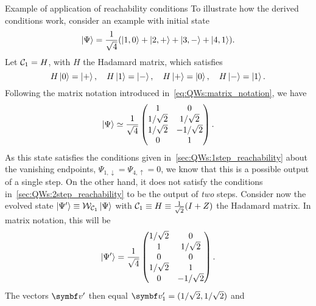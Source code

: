 \begin{examplebox}[label=ex:QWs:conditions_few_steps]{Example of application of reachability conditions}
\fontsize{10pt}{10pt}\selectfont
    To illustrate how the derived conditions work, consider an example with initial state
    \begin{equation}
        \ket{\Psi} = \frac{1}{\sqrt4} (
        \ket{1,0} + \ket{2,+} + \ket{3, -} + \ket{4, 1}
        ).
    \end{equation}
    Let ${\mathcal{C}}_1=H$, with $H$ the Hadamard matrix, which satisfies
    \begin{equation}
        H\ket0=\ket+, \quad H\ket1=\ket-,
        \quad H\ket+=\ket0, \quad H\ket-=\ket1.
    \end{equation}
    Following the matrix notation introduced in~\cref{eq:QWs:matrix_notation}, we have
    \begin{equation}
        \ket{\Psi} \simeq
        \frac{1}{\sqrt4}
        \begin{pmatrix}
            1 & 0 \\
            1/\sqrt2 & 1/\sqrt2 \\
            1/\sqrt2 & -1/\sqrt2 \\
            0 & 1
        \end{pmatrix}.
    \end{equation}
    As this state satisfies the conditions given in~\cref{sec:QWs:1step_reachability} about the vanishing endpoints, $\Psi_{1,\downarrow}=\Psi_{4,\uparrow}=0$, we know that this is a possible output of a single step. On the other hand, it does not satisfy the conditions in~\cref{sec:QWs:2step_reachability} to be the output of \textit{two} steps.
    Consider now the evolved state $\ket{\Psi'}\equiv{\mathcal{W}}_{{\mathcal{C}}_1}\ket\Psi$ with ${\mathcal{C}}_1\equiv H\equiv\frac{1}{\sqrt2}(I+Z)$ the Hadamard matrix. In matrix notation, this will be
    \begin{equation}
        \ket{\Psi'} =
        \frac{1}{\sqrt4}
        \begin{pmatrix}
            1/\sqrt2 & 0 \\
            1 & 1/\sqrt2 \\ 
            0 & 0 \\
            1/\sqrt2 & 1 \\
            0 & -1/\sqrt2
        \end{pmatrix}.
        \label{eq:QWs:example_psi'}
    \end{equation}
    The vectors $\bs v'$ then equal $\bs v'_1=(1/\sqrt2, 1/\sqrt2)$ and

\end{examplebox}
